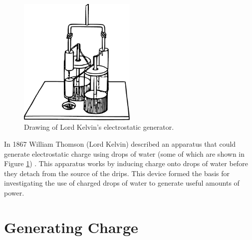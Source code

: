 \begin{figure}
    \centering
    \includegraphics[width=0.5\textwidth]{content/appendices/chargedWaterDrops/graphics/Figure_Drawing_KelvinWaterDripper_OriginalDevice}
    \caption{Drawing of Lord Kelvin's electrostatic generator.}
    \label{Figure_Drawing_KelvinWaterDripper_OriginalDevice}
\end{figure}
In 1867 William Thomson (Lord Kelvin) described an apparatus that could generate electrostatic charge using drops of water (some of
which are shown in Figure \ref{Figure_Drawing_KelvinWaterDripper_OriginalDevice})
\cite{Thomson1867}.
This apparatus works by inducing charge onto drops of water before they detach from the source of the drips.
This device formed the basis for investigating the use of charged drops of water to generate useful amounts of power.


\section{Generating Charge}

